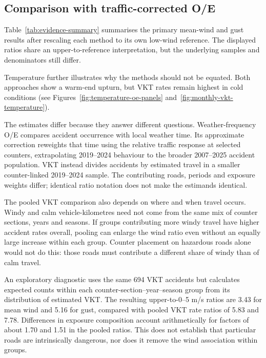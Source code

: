 \subsection{Comparison with traffic-corrected O/E}
\label{sec:method-comparison}

Table~\ref{tab:evidence-summary} summarises the primary mean-wind and gust results after rescaling each method to its own low-wind reference. The displayed ratios share an upper-to-reference interpretation, but the underlying samples and denominators still differ.




Temperature further illustrates why the methods should not be equated. Both approaches show a warm-end upturn, but VKT rates remain highest in cold conditions (see Figures~\ref{fig:temperature-oe-panels} and~\ref{fig:monthly-vkt-temperature}).

The estimates differ because they answer different questions. Weather-frequency O/E compares accident occurrence with local weather time. Its approximate correction reweights that time using the relative traffic response at selected counters, extrapolating 2019--2024 behaviour to the broader 2007--2025 accident population. VKT instead divides accidents by estimated travel in a smaller counter-linked 2019--2024 sample. The contributing roads, periods and exposure weights differ; identical ratio notation does not make the estimands identical.

The pooled VKT comparison also depends on where and when travel occurs. Windy and calm vehicle-kilometres need not come from the same mix of counter sections, years and seasons. If groups contributing more windy travel have higher accident rates overall, pooling can enlarge the wind ratio even without an equally large increase within each group. Counter placement on hazardous roads alone would not do this: those roads must contribute a different share of windy than of calm travel.

An exploratory diagnostic uses the same 694 VKT accidents but calculates expected counts within each counter-section--year--season group from its distribution of estimated VKT. The resulting upper-to-0--5 m/s ratios are 3.43 for mean wind and 5.16 for gust, compared with pooled VKT rate ratios of 5.83 and 7.78. Differences in exposure composition account arithmetically for factors of about 1.70 and 1.51 in the pooled ratios. This does not establish that particular roads are intrinsically dangerous, nor does it remove the wind association within groups.

